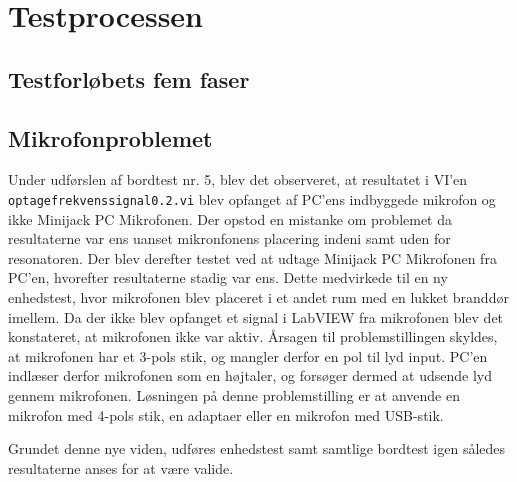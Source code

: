 \chapter{Testprocessen}

\section{Testforløbets fem faser}

\section{Mikrofonproblemet}

Under udførslen af bordtest nr. 5, blev det observeret, at resultatet i VI'en \texttt{optagefrekvenssignal0.2.vi} blev opfanget af PC'ens indbyggede mikrofon og ikke Minijack PC Mikrofonen. 
Der opstod en mistanke om problemet da resultaterne var ens uanset mikronfonens placering indeni samt uden for resonatoren. Der blev derefter testet ved at udtage Minijack PC Mikrofonen fra PC'en, hvorefter resultaterne stadig var ens. Dette medvirkede til en ny enhedstest, hvor mikrofonen blev placeret i et andet rum med en lukket branddør imellem. Da der ikke blev opfanget et signal i LabVIEW fra mikrofonen blev det konstateret, at mikrofonen ikke var aktiv. Årsagen til problemstillingen skyldes, at mikrofonen har et 3-pols stik, og mangler derfor en pol til lyd input. PC'en indlæser derfor mikrofonen som en højtaler, og forsøger dermed at udsende lyd gennem mikrofonen. 
Løsningen på denne problemstilling er at anvende en mikrofon med 4-pols stik, en adaptaer eller en mikrofon med USB-stik.     

Grundet denne nye viden, udføres enhedstest samt samtlige bordtest igen således resultaterne anses for at være valide. 

